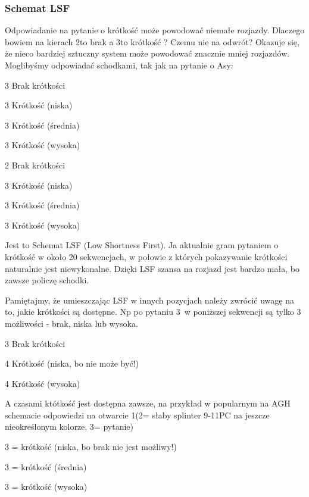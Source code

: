 \documentclass[12pt, a4paper]{article}
\begin{document}
\subsubsection*{Schemat LSF}
Odpowiadanie na pytanie o krótkość może powodować niemałe rozjazdy. Dlaczego bowiem na kierach 2\nt to brak a 3\hearts to krótkość \spades? Czemu nie na odwrót?
Okazuje się, że nieco bardziej sztuczny system może powodować znacznie mniej rozjazdów. Moglibyśmy odpowiadać schodkami, tak jak na pytanie o Asy:

\sequence{{1\spades}{2\clubs}{2\spades}{2\ntx\alrt}}
\begin{options}[1]
	\item[3\clubs] Brak krótkości
	\item[3\diams] Krótkość \clubs (niska)
	\item[3\hearts] Krótkość \diams (średnia)
	\item[3\spades] Krótkość \hearts (wysoka)
\end{options}

\sequence{{1\hearts}{2\clubs}{2\hearts}{2\spades\alrt}}
\begin{options}[1]
	\item[2\nt] Brak krótkości
	\item[3\clubs] Krótkość \clubs (niska)
	\item[3\diams] Krótkość \diams (średnia)
	\item[3\hearts] Krótkość \spades (wysoka)
\end{options}


Jest to Schemat LSF (Low Shortness First). Ja aktualnie gram pytaniem o krótkość w około 20 sekwencjach, w połowie z których pokazywanie krótkości naturalnie jest niewykonalne.
Dzięki LSF szansa na rozjazd jest bardzo mała, bo zawsze policzę schodki.

Pamiętajmy, że umieszczając LSF w innych pozycjach należy zwrócić uwagę na to, jakie krótkości są dostępne. Np po pytaniu 3\spades\alrt\ w poniższej sekwencji są tylko 3 możliwości - brak, niska lub wysoka.
\sequence{{1\clubs}{1\hearts}{3\hearts}{3\spades\alrt}}
\begin{options}
	\item[3\nt] Brak krótkości
	\item[4\clubs] Krótkość \diams (niska, bo \clubs nie może być!)
	\item[4\diams] Krótkość \spades (wysoka)
\end{options}

A czasami któtkość jest dostępna zawsze, na przykład w popularnym na AGH schemacie odpowiedzi na otwarcie 1\spades (2\nt = słaby splinter 9-11PC na jeszcze nieokreślonym kolorze, 3\clubs = pytanie)
\sequence{{1\spades}{2\ntx\alrt}{3\clubs\alrt}}
\begin{options}[2]
	\item[3\diams] = krótkość \clubs (niska, bo brak nie jest możliwy!)
	\item[3\hearts] = krótkość \diams (średnia)
	\item[3\spades] = krótkość \hearts (wysoka)
\end{options}
\end{document}

